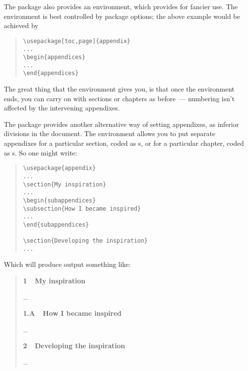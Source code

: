 The package also provides an  environment,
which provides for fancier use.  The environment is best controlled by
package options; the above example would be achieved by
\begin{quote}
\begin{verbatim}
\usepackage[toc,page]{appendix}
...
\begin{appendices}
...
\end{appendices}
\end{verbatim}
\end{quote}
The great thing that the  environment gives
you, is that once the environment ends, you can carry on with sections
or chapters as before~--- numbering isn't affected by the intervening
appendixes.

The package provides another alternative way of setting appendixes, as
inferior divisions in the document.  The 
environment allows you to put separate appendixes for a particular
section, coded as s, or for a particular chapter, coded
as s.  So one might write:
\begin{quote}
\begin{verbatim}
\usepackage{appendix}
...
\section{My inspiration}
...
\begin{subappendices}
\subsection{How I became inspired}
...
\end{subappendices}

\section{Developing the inspiration}
...
\end{verbatim}
\end{quote}
Which will produce output something like:
\begin{quote}
\textbf{1~~My inspiration}

\dots{}

\textbf{1.A~~How I became inspired}

\dots{}

\textbf{2~~Developing the inspiration}

\dots{}
\end{quote}

